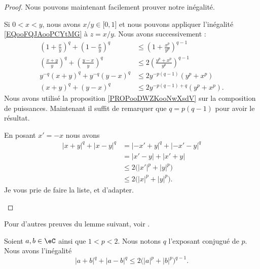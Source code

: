 \begin{proof}
    Nous pouvons maintenant facilement prouver notre inégalité.
    \begin{subproof}
    \spitem[Pour \( 0<x<y\)]
        Si \( 0<x<y\), nous avons \( x/y\in \mathopen[ 0 , 1 \mathclose]\) et nous pouvons appliquer l'inégalité \eqref{EQooFQJAooPCYtMG} à \( z=x/y\). Nous avons successivement :
        \begin{subequations}
            \begin{align}
                \left(1+\frac{ x }{ y }\right)^q+\left( 1-\frac{ x }{ y } \right)^q&\leq \left( 1+\frac{ x^p }{ y^p } \right)^{q-1}\\
                \left( \frac{ x+y }{ y } \right)^q+\left( \frac{ y-x }{ y } \right)^q&\leq 2\left( \frac{ y^p+x^p }{ y^p } \right)^{q-1}\\
                y^{-q}(x+y)^q+y^{-q}(y-x)^q&\leq 2y^{-p(q-1)}(y^p+x^p)\\
                (x+y)^q+(y-x)^q&\leq 2y^{-p(q-1)+q}(y^p+x^p).
            \end{align}
        \end{subequations}
        Nous avons utilisé la proposition \ref{PROPooDWZKooNwXsdV} sur la composition de puissances. Maintenant il suffit de remarquer que \( q=p(q-1)\) pour avoir le résultat.

    \spitem[\( x<0\) et \( y>0\)]
        En posant \( x'=-x\) nous avons
        \begin{subequations}
            \begin{align}
                | x+y |^q+| x-y |^q&=| -x'+y |^q+| -x'-y |^q\\
                &=| x'-y |+| x'+y |\\
                &\leq 2\big( | x' |^p+| y |^p \big)\\
                &\leq 2\big( | x |^p+| y |^p \big).
            \end{align}
        \end{subequations}
        Je vous prie de faire la liste, et d'adapter.
    \end{subproof}
\end{proof}


Pour d'autres preuves du lemme suivant, voir \cite{BIBooHJQOooJsInho}.
\begin{lemma}       \label{LEMooLTROooVusGte}
    Soient \( a,b\in \eC\) ainsi que \( 1<p<2\). Nous notons \( q\) l'exposant conjugué de \( p\). Nous avons l'inégalité
    \begin{equation}
        | a+b |^q+| a-b |^q\leq 2\big( | a |^p+| b |^p \big)^{q-1}.
    \end{equation}
\end{lemma}

